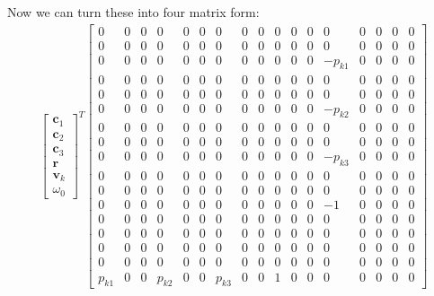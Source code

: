 \documentclass{article}
\begin{document}
Now we can turn these into four matrix form:
\begin{align}
    \begin{bmatrix}
        \mathbf{c}_1 \\
        \mathbf{c}_2 \\
        \mathbf{c}_3 \\
        \mathbf{r} \\
        \mathbf{v}_k \\
        \omega_0
    \end{bmatrix}^T 
    \begin{bmatrix}
        0 & 0 & 0 & 0 & 0 & 0 & 0 & 0 & 0 & 0 & 0 & 0 & 0 & 0 & 0 & 0 & 0 \\
        0 & 0 & 0 & 0 & 0 & 0 & 0 & 0 & 0 & 0 & 0 & 0 & 0 & 0 & 0 & 0 & 0 \\
        0 & 0 & 0 & 0 & 0 & 0 & 0 & 0 & 0 & 0 & 0 & 0 & -p_{k1} & 0 & 0 & 0 & 0 \\
        0 & 0 & 0 & 0 & 0 & 0 & 0 & 0 & 0 & 0 & 0 & 0 & 0 & 0 & 0 & 0 & 0 \\
        0 & 0 & 0 & 0 & 0 & 0 & 0 & 0 & 0 & 0 & 0 & 0 & 0 & 0 & 0 & 0 & 0 \\
        0 & 0 & 0 & 0 & 0 & 0 & 0 & 0 & 0 & 0 & 0 & 0 & -p_{k2} & 0 & 0 & 0 & 0 \\
        0 & 0 & 0 & 0 & 0 & 0 & 0 & 0 & 0 & 0 & 0 & 0 & 0 & 0 & 0 & 0 & 0 \\
        0 & 0 & 0 & 0 & 0 & 0 & 0 & 0 & 0 & 0 & 0 & 0 & 0 & 0 & 0 & 0 & 0 \\
        0 & 0 & 0 & 0 & 0 & 0 & 0 & 0 & 0 & 0 & 0 & 0 & -p_{k3} & 0 & 0 & 0 & 0 \\
        0 & 0 & 0 & 0 & 0 & 0 & 0 & 0 & 0 & 0 & 0 & 0 & 0 & 0 & 0 & 0 & 0 \\
        0 & 0 & 0 & 0 & 0 & 0 & 0 & 0 & 0 & 0 & 0 & 0 & 0 & 0 & 0 & 0 & 0 \\
        0 & 0 & 0 & 0 & 0 & 0 & 0 & 0 & 0 & 0 & 0 & 0 & -1 & 0 & 0 & 0 & 0 \\
        0 & 0 & 0 & 0 & 0 & 0 & 0 & 0 & 0 & 0 & 0 & 0 & 0 & 0 & 0 & 0 & 0 \\
        0 & 0 & 0 & 0 & 0 & 0 & 0 & 0 & 0 & 0 & 0 & 0 & 0 & 0 & 0 & 0 & 0 \\
        0 & 0 & 0 & 0 & 0 & 0 & 0 & 0 & 0 & 0 & 0 & 0 & 0 & 0 & 0 & 0 & 0 \\
        0 & 0 & 0 & 0 & 0 & 0 & 0 & 0 & 0 & 0 & 0 & 0 & 0 & 0 & 0 & 0 & 0 \\
        p_{k1} & 0 & 0 & p_{k2} & 0 & 0 & p_{k3} & 0 & 0 & 1 & 0 & 0 & 0 & 0 & 0 & 0 & 0
    \end{bmatrix}

\end{align}
\end{document}
